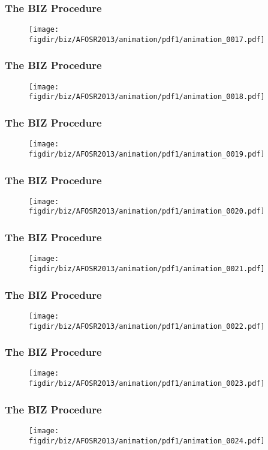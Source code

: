 \documentclass[13pt]{beamer}
\newcommand{\figdir}{../../fig}
\begin{document}
{\begin{frame}\frametitle{The BIZ Procedure}\begin{figure}\texttt{[image: \\figdir/biz/AFOSR2013/animation/pdf1/animation\_0017.pdf]}\end{figure}\end{frame}
\begin{frame}\frametitle{The BIZ Procedure}\begin{figure}\texttt{[image: \\figdir/biz/AFOSR2013/animation/pdf1/animation\_0018.pdf]}\end{figure}\end{frame}
\begin{frame}\frametitle{The BIZ Procedure}\begin{figure}\texttt{[image: \\figdir/biz/AFOSR2013/animation/pdf1/animation\_0019.pdf]}\end{figure}\end{frame}
\begin{frame}\frametitle{The BIZ Procedure}\begin{figure}\texttt{[image: \\figdir/biz/AFOSR2013/animation/pdf1/animation\_0020.pdf]}\end{figure}\end{frame}
\begin{frame}\frametitle{The BIZ Procedure}\begin{figure}\texttt{[image: \\figdir/biz/AFOSR2013/animation/pdf1/animation\_0021.pdf]}\end{figure}\end{frame}
\begin{frame}\frametitle{The BIZ Procedure}\begin{figure}\texttt{[image: \\figdir/biz/AFOSR2013/animation/pdf1/animation\_0022.pdf]}\end{figure}\end{frame}
\begin{frame}\frametitle{The BIZ Procedure}\begin{figure}\texttt{[image: \\figdir/biz/AFOSR2013/animation/pdf1/animation\_0023.pdf]}\end{figure}\end{frame}
\begin{frame}\frametitle{The BIZ Procedure}\begin{figure}\texttt{[image: \\figdir/biz/AFOSR2013/animation/pdf1/animation\_0024.pdf]}\end{figure}\end{frame}
}
\end{document}
